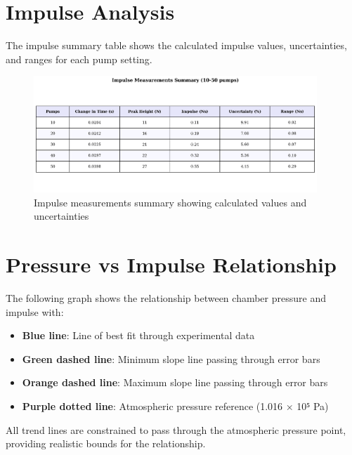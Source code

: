 \documentclass[12pt,a4paper]{article}
\begin{document}
\section{Impulse Analysis}

The impulse summary table shows the calculated impulse values, uncertainties, and ranges for each pump setting.

\begin{figure}[H]
\centering
\includegraphics[width=0.95\textwidth]{impulse_table_updated.png}
\caption{Impulse measurements summary showing calculated values and uncertainties}
\label{fig:impulse_table}
\end{figure}

\section{Pressure vs Impulse Relationship}

The following graph shows the relationship between chamber pressure and impulse with:
\begin{itemize}
    \item \textbf{Blue line}: Line of best fit through experimental data
    \item \textbf{Green dashed line}: Minimum slope line passing through error bars
    \item \textbf{Orange dashed line}: Maximum slope line passing through error bars
    \item \textbf{Purple dotted line}: Atmospheric pressure reference (1.016 × 10⁵ Pa)
\end{itemize}

All trend lines are constrained to pass through the atmospheric pressure point, providing realistic bounds for the relationship.
\end{document}
